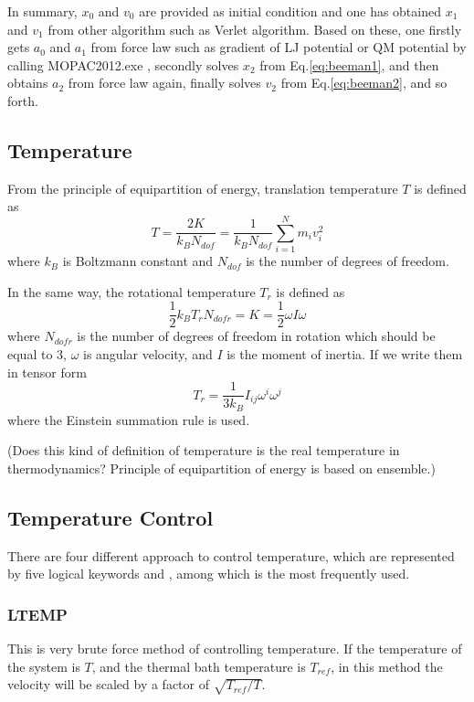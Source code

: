 \documentclass[11pt]{JHEP3}
\begin{document}
In summary, $x_0$ and $v_0$ are provided as initial condition and
one has obtained $x_1$ and $v_1$ from other algorithm such as Verlet
algorithm. Based on these, one firstly gets $a_0$ and $a_1$ from
force law such as gradient of LJ potential or QM potential by
calling MOPAC2012.exe , secondly solves $x_2$ from
Eq.\ref{eq:beeman1}, and then obtains $a_2$ from force law again,
finally solves $v_2$ from Eq.\ref{eq:beeman2}, and so forth.


\subsection{Temperature}
From the principle of equipartition of energy, translation
temperature $T$ is defined as
\begin{equation}
T=\frac{2K}{k_B N_{dof}}=\frac{1}{k_B N_{dof}}\sum^N_{i=1}m_i v_i^2
\end{equation}
where $k_B$ is Boltzmann constant and $N_{dof}$ is the number of
degrees of freedom.

In the same way, the rotational temperature $T_r$ is defined as
\[
\frac{1}{2}k_B T_r N_{dofr} = K = \frac{1}{2}\omega I \omega
\]
where $N_{dofr}$ is the number of degrees of freedom in rotation
which should be equal to $3$, $\omega$ is angular velocity, and $I$
is the moment of inertia. If we write them in tensor form
\begin{equation}
T_r = \frac{1}{3 k_B} I_{ij}\omega^i\omega^j
\end{equation}
where the Einstein summation rule is used.

(Does this kind of definition of temperature is the real temperature
in thermodynamics? Principle of equipartition of energy is based on
ensemble.)

\subsection{Temperature Control}\label{sec:tem}
There are four different approach to control temperature, which are
represented by five logical keywords
 and , among which
 is the most frequently used.

\subsubsection*{LTEMP}
This is very brute force method of controlling temperature. If the
temperature of the system is $T$, and the thermal bath temperature
is $T_{ref}$, in this method the velocity will be scaled by a factor
of $\sqrt{T_{ref}/T}$.
\end{document}
